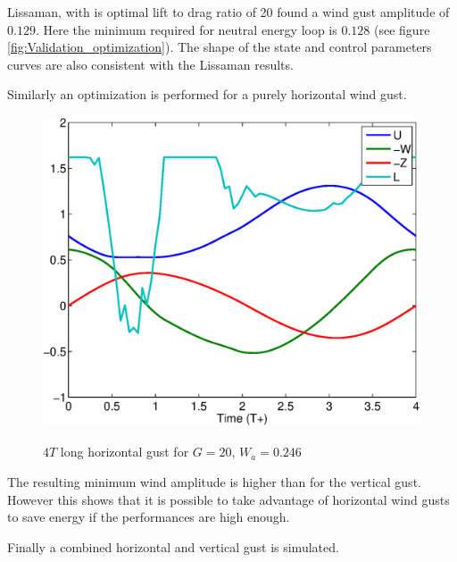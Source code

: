 \FloatBarrier

Lissaman, with is optimal lift to drag ratio of 20 found a wind gust amplitude of $0.129$. 
Here the minimum required for neutral energy loop is $0.128$ (see figure \ref{fig:Validation_optimization}).
The shape of the state and control parameters curves are also consistent with the Lissaman results.

\par Similarly an optimization is performed for a purely horizontal wind gust.

\begin{figure}[h]
  \begin{center}
    \scalebox{0.8}
    {\includegraphics{./Figures/Windtype=2_Tg=4_Wg=0p246_quad_G=20.eps}}
  \end{center}
  \caption{$4T$ long horizontal gust for $G=20$, $W_a=0.246$}
  \label{fig:Horizontal_optimization}
\end{figure}

The resulting minimum wind amplitude is higher than for the vertical gust. 
However this shows that it is possible to take advantage of horizontal wind gusts to save energy if the performances are high enough.

\par Finally a combined horizontal and vertical gust is simulated.

